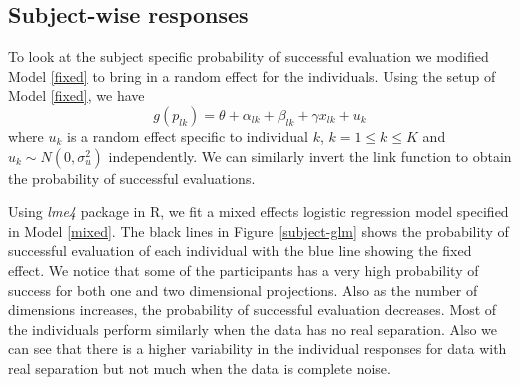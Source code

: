 \documentclass[12]{article}
\begin{document}



\subsection{Subject-wise responses}

To look at the subject specific probability of successful evaluation we modified Model \ref{fixed} to bring in  a random effect for the individuals. Using the setup of Model \ref{fixed}, we have
\begin{equation}
g(p_{lk}) = \theta + \alpha_{lk} + \beta_{lk} + \gamma x_{lk} + u_k \label{mixed}
\end{equation}
where $u_k$ is a random effect specific to individual $k$, $k = 1 \leq k \leq K$ and $u_k \sim N(0, \sigma_u^2)$ independently. We can similarly invert the link function to obtain the probability of successful evaluations.

Using \textit{lme4} package in R, we fit a mixed effects logistic regression model specified in Model \ref{mixed}. The black lines in Figure \ref{subject-glm} shows the probability of successful evaluation of each individual with the blue line showing the fixed effect. We notice that some of the participants has a very high probability of success for both one and two dimensional projections. Also as the number of dimensions increases, the probability of successful evaluation decreases. Most of the individuals perform similarly when the data has no real separation. Also we can see that there is a higher variability in the individual responses for data with real separation but not much when the data is complete noise.
\end{document}
